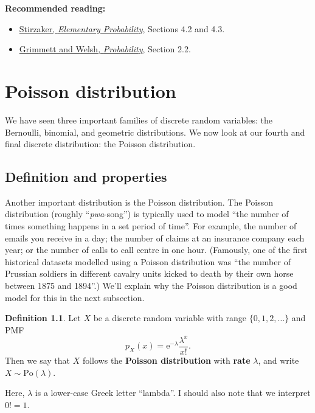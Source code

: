 \documentclass[
  a4paper,
]{book}
\providecommand{\tightlist}{%
  \setlength{\itemsep}{0pt}\setlength{\parskip}{0pt}}
\theoremstyle{definition}
\newtheorem{definition}{Definition}[chapter]
\theoremstyle{definition}
\theoremstyle{definition}
\theoremstyle{definition}
\theoremstyle{remark}
\begin{document}
\textbf{Recommended reading:}

\begin{itemize}
\tightlist
\item
  \href{https://leeds.primo.exlibrisgroup.com/permalink/44LEE_INST/13rlbcs/alma991013131349705181}{Stirzaker, \emph{Elementary Probability}}, Sections 4.2 and 4.3.
\item
  \href{https://leeds.primo.exlibrisgroup.com/permalink/44LEE_INST/13rlbcs/alma991002938669705181}{Grimmett and Welsh, \emph{Probability}}, Section 2.2.
\end{itemize}

\hypertarget{L12-poisson}{%
\chapter{Poisson distribution}\label{L12-poisson}}

We have seen three important families of discrete random variables: the Bernoulli, binomial, and geometric distributions. We now look at our fourth and final discrete distribution: the Poisson distribution.

\hypertarget{poisson}{%
\section{Definition and properties}\label{poisson}}

Another important distribution is the Poisson distribution. The Poisson distribution (roughly ``\emph{pwa}-song'') is typically used to model ``the number of times something happens in a set period of time''. For example, the number of emails you receive in a day; the number of claims at an insurance company each year; or the number of calls to call centre in one hour. (Famously, one of the first historical datasets modelled using a Poisson distribution was ``the number of Prussian soldiers in different cavalry units kicked to death by their own horse between 1875 and 1894''.) We'll explain why the Poisson distribution is a good model for this in the next subsection.

\begin{definition}
Let \(X\) be a discrete random variable with range \(\{0,1,2,\dots\}\) and PMF
\[ p_X(x) = \mathrm e^{-\lambda}  \frac{\lambda^x}{x!} . \]
Then we say that \(X\) follows the \textbf{Poisson distribution} with \textbf{rate} \(\lambda\), and write \(X \sim \text{Po}(\lambda)\).
\end{definition}

Here, \(\lambda\) is a lower-case Greek letter ``lambda''. I should also note that we interpret \(0! = 1\).
\end{document}
